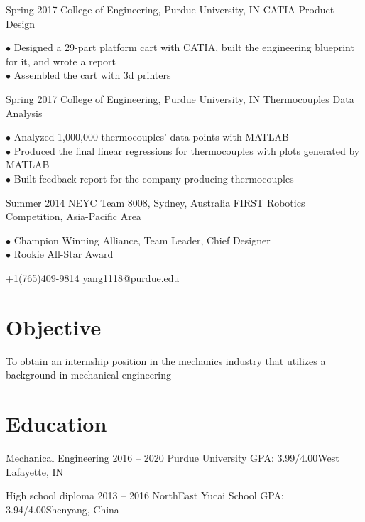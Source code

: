 \documentclass{tccv}
\begin{document}
\begin{eventlist}

\item{Spring 2017}
     {College of Engineering, Purdue University, IN}
     {CATIA Product Design}
     
$\bullet$ Designed a 29-part platform cart with CATIA, built the engineering blueprint for it, and wrote a report\\
$\bullet$ Assembled the cart with 3d printers

\item{Spring 2017}
     {College of Engineering, Purdue University, IN}
     {Thermocouples Data Analysis}

$\bullet$ Analyzed 1,000,000 thermocouples’ data points with MATLAB\\
$\bullet$ Produced the final linear regressions for thermocouples with plots generated by MATLAB\\
$\bullet$ Built feedback report for the company producing thermocouples

\item{Summer 2014}
     {NEYC Team 8008, Sydney, Australia}
     {FIRST Robotics Competition, Asia-Pacific Area}
     
$\bullet$ Champion Winning Alliance, Team Leader, Chief Designer\\
$\bullet$ Rookie All-Star Award


\end{eventlist}

    {+1(765)409-9814}
    {yang1118@purdue.edu}
    
\section{Objective}

To obtain an internship position in the mechanics industry that utilizes a background in mechanical engineering

\section{Education}

\begin{yearlist}

\item[Mechanical Engineering]{2016 -- 2020}
     {Purdue University}
     {GPA: 3.99/4.00\newline West Lafayette, IN}
     
\item[High school diploma]{2013 -- 2016}
     {NorthEast Yucai School}
     {GPA: 3.94/4.00\newline Shenyang, China}

\end{yearlist}
\end{document}
